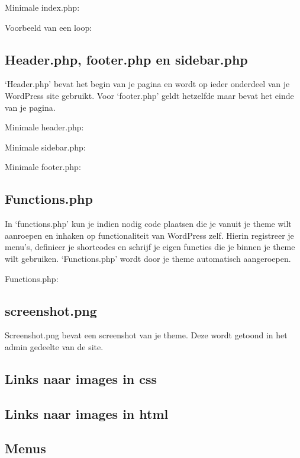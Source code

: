 \documentclass[8pt,pagesize,footinclude=false,headinclude=false]{scrartcl}
\begin{document}
\begin{multicols*}{4}
\noindent Minimale index.php:


\noindent Voorbeeld van een loop:


\subsection*{Header.php, footer.php en sidebar.php}
`Header.php' bevat het begin van je pagina en wordt op ieder onderdeel van je WordPress site gebruikt. Voor `footer.php' geldt hetzelfde maar bevat het einde van je pagina.

\noindent Minimale header.php:


\noindent Minimale sidebar.php:


\noindent Minimale footer.php:


\subsection*{Functions.php}
In `functions.php' kun je indien nodig code plaatsen die je vanuit je theme wilt aanroepen en inhaken op functionaliteit van WordPress zelf. Hierin registreer je menu's, definieer je shortcodes en schrijf je eigen functies die je binnen je theme wilt gebruiken. `Functions.php' wordt door je theme automatisch aangeroepen.

\noindent Functions.php:


\subsection*{screenshot.png}
Screenshot.png bevat een screenshot van je theme. Deze wordt getoond in het admin gedeelte van de site.

\subsection*{Links naar images in css}

\subsection*{Links naar images in html}

\subsection*{Menus}


\end{multicols*}
\end{document}
